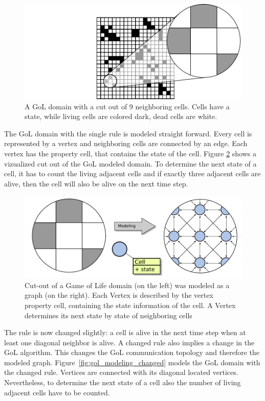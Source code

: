 \begin{figure}[H]
  \centering \includegraphics[width=\textwidth]{graphics/30_gol_simulation}
  \caption{A GoL domain with a cut out of 9 neighboring cells. Cells have
  a state, while living cells are colored dark, dead cells are white.}
  \label{fig:gol_simulation}
\end{figure}

The GoL domain with the single rule is modeled straight forward. Every
cell is represented by a vertex and neighboring cells are connected by
an edge.  Each vertex has the property cell, that contains the state
of the cell. Figure \ref{fig:gol_modeling} shows a vizualized cut out
of the GoL modeled domain. To determine the next state of a cell, it
has to count the living adjacent cells and if exactly three adjacent
cells are alive, then the cell will also be alive on the next time
step.

\begin{figure}[H]
  \centering \includegraphics[width=\textwidth]{graphics/30_gol_modeling}
  \caption{Cut-out of a Game of Life domain (on the left) was modeled
    as a graph (on the right). Each Vertex is described by the vertex
    property cell, containing the state information of the cell. A
    Vertex determines its next state by state of neighboring cells}
  \label{fig:gol_modeling}
\end{figure}

The rule is now changed slightly: a cell is alive in the next time
step when at least one diagonal neighbor is alive.  A changed rule
also implies a change in the GoL algorithm.  This changes the GoL
communication topology and therefore the modeled
graph. Figure~\ref{fig:gol_modeling_changed} models the GoL domain
with the changed rule. Vertices are connected with its diagonal
located vertices. Nevertheless, to determine the next state of a cell
also the number of living adjacent cells have to be counted.

